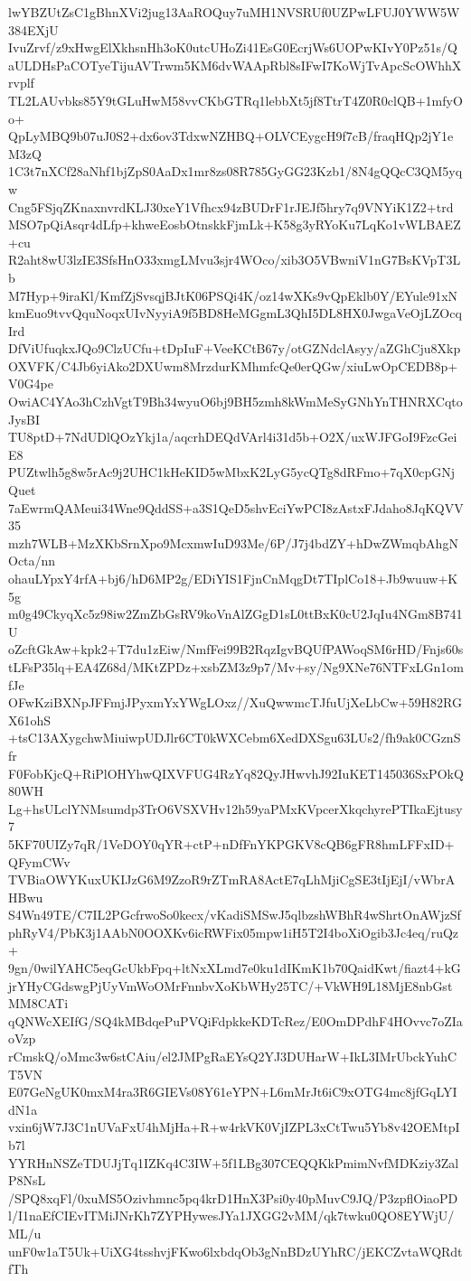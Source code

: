 lwYBZUtZsC1gBhnXVi2jug13AaROQuy7uMH1NVSRUf0UZPwLFUJ0YWW5W384EXjU
IvuZrvf/z9xHwgElXkhsnHh3oK0utcUHoZi41EsG0EcrjWs6UOPwKIvY0Pz51s/Q
aULDHsPaCOTyeTijuAVTrwm5KM6dvWAApRbl8sIFwI7KoWjTvApcScOWhhXrvplf
TL2LAUvbks85Y9tGLuHwM58vvCKbGTRq1lebbXt5jf8TtrT4Z0R0clQB+1mfyOo+
QpLyMBQ9b07uJ0S2+dx6ov3TdxwNZHBQ+OLVCEygcH9f7cB/fraqHQp2jY1eM3zQ
1C3t7nXCf28aNhf1bjZpS0AaDx1mr8zs08R785GyGG23Kzb1/8N4gQQcC3QM5yqw
Cng5FSjqZKnaxnvrdKLJ30xeY1Vfhcx94zBUDrF1rJEJf5hry7q9VNYiK1Z2+trd
MSO7pQiAsqr4dLfp+khweEosbOtnskkFjmLk+K58g3yRYoKu7LqKo1vWLBAEZ+cu
R2aht8wU3lzIE3SfsHnO33xmgLMvu3sjr4WOco/xib3O5VBwniV1nG7BsKVpT3Lb
M7Hyp+9iraKl/KmfZjSvsqjBJtK06PSQi4K/oz14wXKs9vQpEklb0Y/EYule91xN
kmEuo9tvvQquNoqxUIvNyyiA9f5BD8HeMGgmL3QhI5DL8HX0JwgaVeOjLZOcqIrd
DfViUfuqkxJQo9ClzUCfu+tDpIuF+VeeKCtB67y/otGZNdclAsyy/aZGhCju8Xkp
OXVFK/C4Jb6yiAko2DXUwm8MrzdurKMhmfcQe0erQGw/xiuLwOpCEDB8p+V0G4pe
OwiAC4YAo3hCzhVgtT9Bh34wyuO6bj9BH5zmh8kWmMeSyGNhYnTHNRXCqtoJysBI
TU8ptD+7NdUDlQOzYkj1a/aqcrhDEQdVArl4i31d5b+O2X/uxWJFGoI9FzcGeiE8
PUZtwlh5g8w5rAc9j2UHC1kHeKID5wMbxK2LyG5ycQTg8dRFmo+7qX0cpGNjQuet
7aEwrmQAMeui34Wne9QddSS+a3S1QeD5shvEciYwPCI8zAstxFJdaho8JqKQVV35
mzh7WLB+MzXKbSrnXpo9McxmwIuD93Me/6P/J7j4bdZY+hDwZWmqbAhgNOcta/nn
ohauLYpxY4rfA+bj6/hD6MP2g/EDiYIS1FjnCnMqgDt7TIplCo18+Jb9wuuw+K5g
m0g49CkyqXc5z98iw2ZmZbGsRV9koVnAlZGgD1sL0ttBxK0cU2JqIu4NGm8B741U
oZcftGkAw+kpk2+T7du1zEiw/NmfFei99B2RqzIgvBQUfPAWoqSM6rHD/Fnjs60s
tLFsP35lq+EA4Z68d/MKtZPDz+xsbZM3z9p7/Mv+sy/Ng9XNe76NTFxLGn1omfJe
OFwKziBXNpJFFmjJPyxmYxYWgLOxz//XuQwwmcTJfuUjXeLbCw+59H82RGX61ohS
+tsC13AXygchwMiuiwpUDJlr6CT0kWXCebm6XedDXSgu63LUs2/fh9ak0CGznSfr
F0FobKjcQ+RiPlOHYhwQIXVFUG4RzYq82QyJHwvhJ92IuKET145036SxPOkQ80WH
Lg+hsULclYNMsumdp3TrO6VSXVHv12h59yaPMxKVpcerXkqchyrePTIkaEjtusy7
5KF70UIZy7qR/1VeDOY0qYR+ctP+nDfFnYKPGKV8cQB6gFR8hmLFFxID+QFymCWv
TVBiaOWYKuxUKIJzG6M9ZzoR9rZTmRA8ActE7qLhMjiCgSE3tIjEjI/vWbrAHBwu
S4Wn49TE/C7IL2PGcfrwoSo0kecx/vKadiSMSwJ5qlbzshWBhR4wShrtOnAWjzSf
phRyV4/PbK3j1AAbN0OOXKv6icRWFix05mpw1iH5T2I4boXiOgib3Jc4eq/ruQz+
9gn/0wilYAHC5eqGcUkbFpq+ltNxXLmd7e0ku1dIKmK1b70QaidKwt/fiazt4+kG
jrYHyCGdswgPjUyVmWoOMrFnnbvXoKbWHy25TC/+VkWH9L18MjE8nbGstMM8CATi
qQNWcXEIfG/SQ4kMBdqePuPVQiFdpkkeKDTcRez/E0OmDPdhF4HOvvc7oZIaoVzp
rCmskQ/oMmc3w6stCAiu/el2JMPgRaEYsQ2YJ3DUHarW+IkL3IMrUbckYuhCT5VN
E07GeNgUK0mxM4ra3R6GIEVs08Y61eYPN+L6mMrJt6iC9xOTG4mc8jfGqLYIdN1a
vxin6jW7J3C1nUVaFxU4hMjHa+R+w4rkVK0VjIZPL3xCtTwu5Yb8v42OEMtpIb7l
YYRHnNSZeTDUJjTq1IZKq4C3IW+5f1LBg307CEQQKkPmimNvfMDKziy3ZalP8NsL
/SPQ8xqFl/0xuMS5Ozivhmnc5pq4krD1HnX3Psi0y40pMuvC9JQ/P3zpflOiaoPD
l/I1naEfCIEvITMiJNrKh7ZYPHywesJYa1JXGG2vMM/qk7twku0QO8EYWjU/ML/u
unF0w1aT5Uk+UiXG4tsshvjFKwo6lxbdqOb3gNnBDzUYhRC/jEKCZvtaWQRdtfTh
